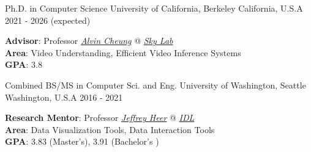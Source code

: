 
\begin{cventries}

\vspace{-4.0mm}
\begin{multicols}{2}

  \cventrycol
    {Ph.D. in Computer Science} %
    {University of California, Berkeley} %
    {California, U.S.A} %
    {2021 - 2026 (expected)} %
    {
      \vspace{-4.0mm}
      \begin{justify}
        \textbf{Advisor}: Professor \href{https://people.eecs.berkeley.edu/~akcheung/}{\textit{Alvin Cheung}} @ \href{https://sky.cs.berkeley.edu/}{\textit{Sky Lab}}\\
        \textbf{Area}: Video Understanding, Efficient Video Inference Systems\\
        \textbf{GPA}: 3.8
      \end{justify}
    }
  \cventrycol
    {Combined BS/MS in Computer Sci. and Eng.} %
    {University of Washington, Seattle} %
    {Washington, U.S.A} %
    {2016 - 2021} %
    {
      \vspace{-4.0mm}
      \begin{justify}
        \textbf{Research Mentor}: Professor \href{https://homes.cs.washington.edu/~jheer/}{\textit{Jeffrey Heer}} @ \href{https://idl.cs.washington.edu/}{\textit{IDL}}\\
        \textbf{Area}: Data Visualization Tools, Data Interaction Tools\\
        \textbf{GPA}: 3.83 (Master's), 3.91 (Bachelor's )
      \end{justify}
    }
\end{multicols}
\vspace{-8mm}
\end{cventries}
